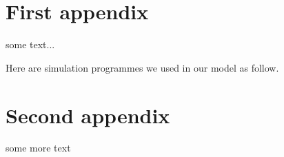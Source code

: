 \documentclass[a4paper,11pt]{article}
\begin{document}
\begin{appendices}
% 
% 
\section{First appendix}

some text...


Here are simulation programmes we used in our model as follow.\\





\section{Second appendix}

some more text


\end{appendices}
\end{document}
